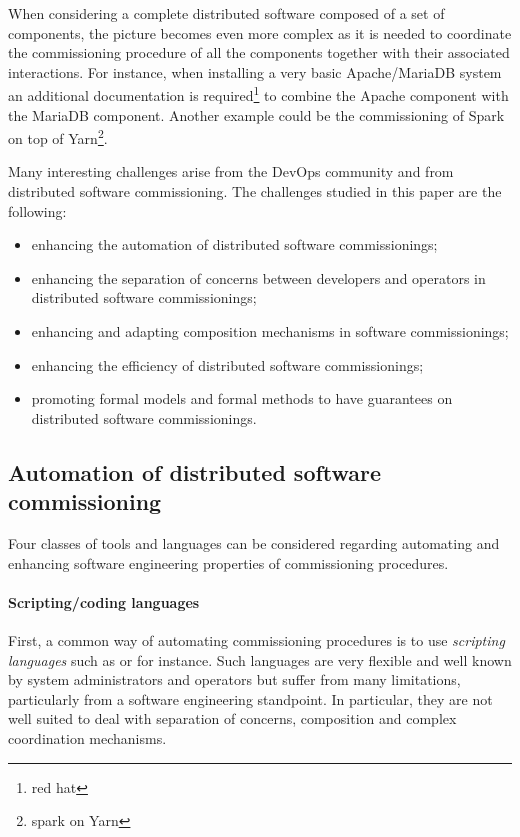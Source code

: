 When considering a complete distributed software composed of a set of
components, the picture becomes even more complex as it is needed to
coordinate the commissioning procedure of all the components together
with their associated interactions. For instance, when installing a
very basic Apache/MariaDB system an additional documentation is
required\footnote{red hat} to combine the Apache component with the
MariaDB component. Another example could be the commissioning of Spark
on top of Yarn\footnote{spark on Yarn}.

Many interesting challenges arise from the DevOps community and from
distributed software commissioning. The challenges studied in this
paper are the following:
\begin{itemize}
\item enhancing the automation of distributed software commissionings;
\item enhancing the separation of concerns between developers and
  operators in distributed software commissionings;
\item enhancing and adapting composition mechanisms in software
  commissionings;
\item enhancing the efficiency of distributed software commissionings;
\item promoting formal models and formal methods to have guarantees on
  distributed software commissionings.
\end{itemize}

\subsection{Automation of distributed software commissioning}

Four classes of tools and languages can be considered regarding
automating and enhancing software engineering properties
of commissioning procedures.


\paragraph{Scripting/coding languages}
First, a common way of automating commissioning procedures is to use
\emph{scripting languages} such as \shell or \ruby for instance. Such
languages are very flexible and well known by system administrators
and operators but suffer from many limitations, particularly from a
software engineering standpoint. In particular, they are not well
suited to deal with separation of concerns, composition and complex
coordination mechanisms.

